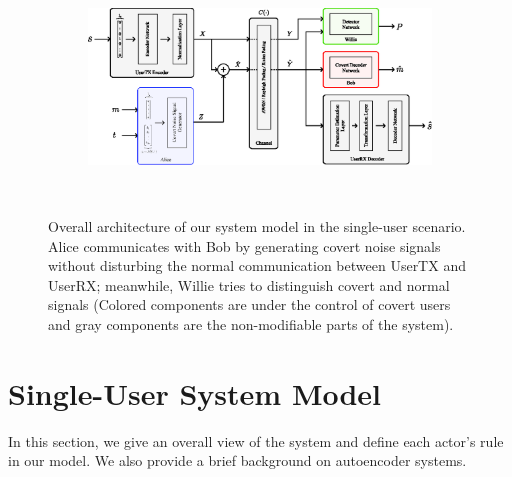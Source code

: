 \begin{figure}[thp]
	\center
	\begin{subfigure}{0.8\textwidth}
		\includegraphics[width=\linewidth]{figs/system_architecture}
	\end{subfigure}
	\\
	\caption{Overall architecture of our system model in the single-user scenario. Alice communicates with Bob by generating covert noise signals without disturbing the normal communication between UserTX and UserRX; meanwhile, Willie tries to distinguish covert and normal signals (Colored components are under the control of covert users and gray components are the non-modifiable parts of the system).}	
	\label{fig:system_architecture}
\end{figure}


\section{Single-User System Model}
\label{s:single-model}
In this section, we give an overall view of the system and define each actor's rule in our model. We also provide a brief background on autoencoder systems.


